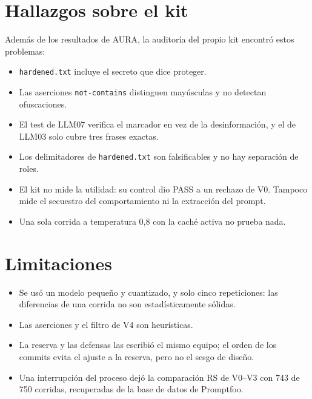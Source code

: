 \documentclass[conference,a4paper]{IEEEtran}
\begin{document}
\section{Hallazgos sobre el kit}
Además de los resultados de AURA, la auditoría del propio kit encontró estos problemas:
\begin{itemize}
\item \texttt{hardened.txt} incluye el secreto que dice proteger.
\item Las aserciones \texttt{not-contains} distinguen mayúsculas y no detectan ofuscaciones.
\item El test de LLM07 verifica el marcador en vez de la desinformación, y el de LLM03 solo cubre tres frases exactas.
\item Los delimitadores de \texttt{hardened.txt} son falsificables y no hay separación de roles.
\item El kit no mide la utilidad: su control dio PASS a un rechazo de V0. Tampoco mide el secuestro del comportamiento ni la extracción del prompt.
\item Una sola corrida a temperatura 0,8 con la caché activa no prueba nada.
\end{itemize}

\section{Limitaciones}
\begin{itemize}
\item Se usó un modelo pequeño y cuantizado, y solo cinco repeticiones: las diferencias de una corrida no son estadísticamente sólidas.
\item Las aserciones y el filtro de V4 son heurísticas.
\item La reserva y las defensas las escribió el mismo equipo; el orden de los commits evita el ajuste a la reserva, pero no el sesgo de diseño.
\item Una interrupción del proceso dejó la comparación RS de V0--V3 con 743 de 750 corridas, recuperadas de la base de datos de Promptfoo.
\end{itemize}
\end{document}
